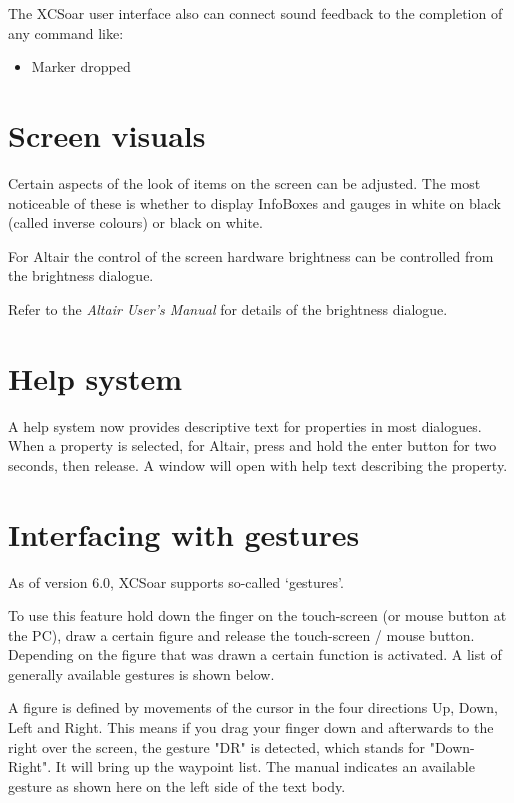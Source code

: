 The XCSoar user interface also can connect sound feedback to the completion
of any command like:
\begin{itemize}
\item Marker dropped
\end{itemize}


\section{Screen visuals}

Certain aspects of the look of items on the screen can be adjusted.
The most noticeable of these is whether to display InfoBoxes and
gauges in white on black (called inverse colours) or black on white.

For Altair the control of the screen hardware
brightness can be controlled from the brightness dialogue.
\begin{quote}
\blink{}
\end{quote}

Refer to the {\em Altair User's Manual} for details of the brightness
dialogue.


\section{Help system}

A help system now provides descriptive text for properties in
most dialogues.  When a property is selected, for Altair, press and hold the
enter button for two seconds, then release.  A window will open with
help text describing the property.

\section{Interfacing with gestures}\label{sec:gestures}
As of version 6.0, XCSoar supports so-called `gestures'.

To use this feature hold down the finger on the
touch-screen (or mouse button at the PC), draw a certain figure and release
the touch-screen / mouse button. Depending on the figure that was drawn
a certain function is activated. A list of generally available gestures is
shown below.

A figure is defined by movements of the
cursor in the four directions Up, Down, Left and Right. This means if
you drag your finger down and afterwards to the right over the screen,
 the gesture "DR" is detected, which stands for "Down-Right".
It will bring up the waypoint list. The manual indicates an available
gesture as shown here on the left side of the text body.

